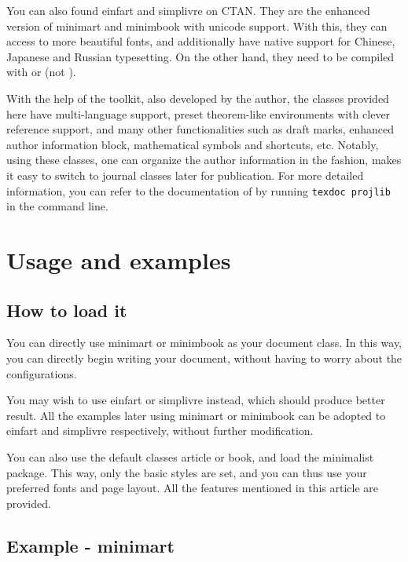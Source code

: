 \documentclass[English,Chinese,French,puretext]{minimart}
\newenvironment{tip}[1][Tip]{%
    \LocallyStopLineNumbers%
    \begin{tcolorbox}[breakable,
        enhanced,
        width = \textwidth,
        colback = paper, colbacktitle = paper,
        colframe = gray!50, boxrule=0.2mm,
        coltitle = black,
        fonttitle = \sffamily,
        attach boxed title to top left = {yshift=-\tcboxedtitleheight/2, xshift=.5cm},
        boxed title style = {boxrule=0pt, colframe=paper},
        before skip = 0.3cm,
        after skip = 0.3cm,
        top = 3mm,
        bottom = 3mm,
        title={\scshape\sffamily #1}]%
}{\end{tcolorbox}\ResumeLineNumbers}
\providecommand{\minimalist}{\textsf{minimalist}}
\providecommand{\minimart}{\textsf{minimart}}
\providecommand{\minimbook}{\textsf{minimbook}}
\providecommand{\einfart}{\textsf{einfart}}
\providecommand{\simplivre}{\textsf{simplivre}}
\let\LevelOneTitle\section
\let\LevelTwoTitle\subsection
\begin{document}
You can also found \einfart{} and \simplivre{} on CTAN. They are the enhanced version of \minimart{} and \minimbook{} with unicode support. With this, they can access to more beautiful fonts, and additionally have native support for Chinese, Japanese and Russian typesetting. On the other hand, they need to be compiled with  or  (not ).

With the help of the \ProjLib{} toolkit, also developed by the author, the classes provided here have multi-language support, preset theorem-like environments with clever reference support, and many other functionalities such as draft marks, enhanced author information block, mathematical symbols and shortcuts, etc. Notably, using these classes, one can organize the author information in the \AmS{} fashion, makes it easy to switch to journal classes later for publication. For more detailed information, you can refer to the documentation of \ProjLib{} by running \lstinline|texdoc projlib| in the command line.

\LevelOneTitle{Usage and examples}

\LevelTwoTitle{How to load it}
You can directly use \minimart{} or \minimbook{} as your document class. In this way, you can directly begin writing your document, without having to worry about the configurations.


\begin{tip}
    You may wish to use \einfart{} or \simplivre{} instead, which should produce better result. All the examples later using \minimart{} or \minimbook{} can be adopted to \einfart{} and \simplivre{} respectively, without further modification.
\end{tip}

You can also use the default classes \textsf{article} or \textsf{book}, and load the \minimalist{} package. This way, only the basic styles are set, and you can thus use your preferred fonts and page layout. All the features mentioned in this article are provided.


\LevelTwoTitle{Example - \minimart}
\end{document}
